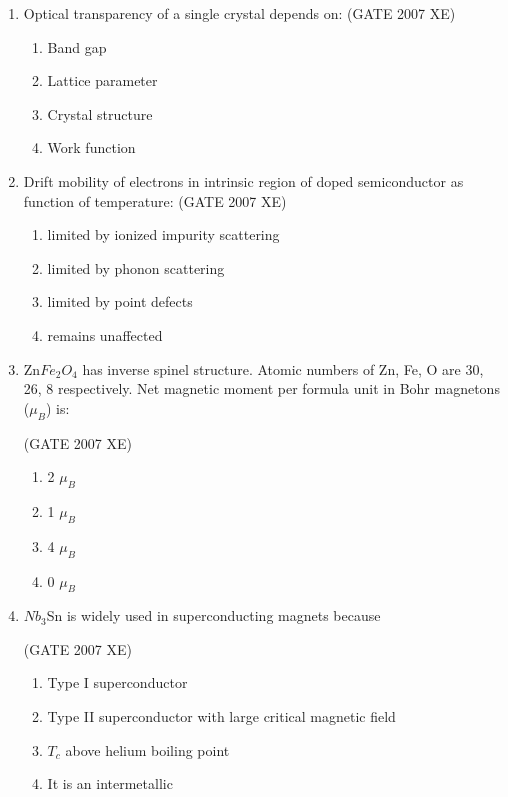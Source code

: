 \documentclass[journal,cmex10]{IEEEtran}
\theoremstyle{remark}
\numberwithin{equation}{enumi}
\numberwithin{figure}{enumi}
\begin{document}
\begin{enumerate}
\item  Optical transparency of a single crystal depends on:  
\hfill{(GATE 2007 XE)}
\begin{multicols}{2}
\begin{enumerate}
    \item Band gap
    \item Lattice parameter
    \item Crystal structure
    \item Work function
\end{enumerate}
\end{multicols}

\item Drift mobility of electrons in intrinsic region of doped semiconductor as function of temperature:  
\hfill{(GATE 2007 XE)}
\begin{multicols}{2}
\begin{enumerate}
    \item limited by ionized impurity scattering
    \item limited by phonon scattering
    \item limited by point defects\\
    \item remains unaffected
\end{enumerate}
\end{multicols}

\item  Zn$Fe_2$$O_4$ has inverse spinel structure. Atomic numbers of Zn, Fe, O are 30, 26, 8 respectively. Net magnetic moment per formula unit in Bohr magnetons ($\mu_B$) is:

\hfill{(GATE 2007 XE)}
\begin{multicols}{4}
\begin{enumerate}
    \item 2 $\mu_B$
    \item 1 $\mu_B$
    \item 4 $\mu_B$
    \item 0 $\mu_B$
\end{enumerate}
\end{multicols}


\item $Nb_3$Sn is widely used in superconducting magnets because

\hfill{(GATE 2007 XE)}
\begin{multicols}{2}
\begin{enumerate}
    \item Type I superconductor
    \item Type II superconductor with large critical magnetic field
    \item $T_c$ above helium boiling point
    \item It is an intermetallic
\end{enumerate}
\end{multicols}


\end{enumerate}
\end{document}
